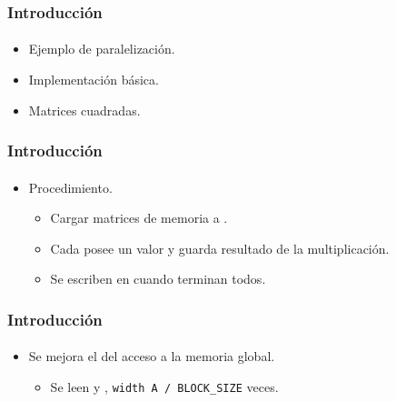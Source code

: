 \frame
{
\frametitle{Introducción}
\framesubtitle{}
\begin{itemize}
	\item<1-> Ejemplo de paralelización.
	\item<2-> Implementación básica.
	\item<3-> Matrices cuadradas.
\end{itemize}
}

\frame
{
\frametitle{Introducción}
\framesubtitle{}
\begin{itemize}
	\item<1-> Procedimiento.
	 \begin{itemize}
	 	\item<2-> Cargar matrices de memoria  a .
		\item<3-> Cada  posee un valor y guarda resultado de la multiplicación.
		\item<4-> Se escriben en  cuando terminan todos.
	 \end{itemize}
\end{itemize}
}

\frame
{
\frametitle{Introducción}
\framesubtitle{}
\begin{itemize}
	\item<1-> Se mejora el  del acceso a la memoria global.
	\begin{itemize}
		\item<2-> Se leen  y , \texttt{width A / BLOCK\_SIZE} veces.
	\end{itemize} 
\end{itemize}
}
